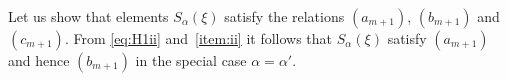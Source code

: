 \documentclass[oneside, 10pt]{amsart}
\newcommand{\rA}{\mathsf{A}}
\numberwithin{equation}{section}
\newtheorem{lemma}{Lemma}
\numberwithin{lemma}{section}
\theoremstyle{definition}
\theoremstyle{remark}
\begin{document}

Let us show that elements $S_\alpha(\xi)$ satisfy the relations $(a_{m+1})$, $(b_{m+1})$ and $(c_{m+1})$.
From \eqref{eq:H1ii} and~\eqref{item:ii} it follows that $S_\alpha(\xi)$  satisfy $(a_{m+1})$ and hence $(b_{m+1})$ in the special case $\alpha=\alpha'$.
\begin{comment}
\begin{lemma} For every $\rA_3$-triple $(\alpha, \beta, \gamma)$ in $\Phi$ and $a,b,c \in A$ the following relation holds in $G_1$:
\begin{align} 
 [x_{\alpha}(a), [x_{\beta}(b t), x_{\gamma}(c t)]] & = [x_{\beta+\alpha}(N_{\beta, \alpha}a b t), x_{\gamma}(ct)].
\end{align}
 \end{lemma}
\begin{proof}
 \begin{align*}
   [x_{\alpha}(a), [x_{\beta}(b t), x_{\gamma}(c t)]] = [[x_{\alpha}(a), x_{\beta}(b t)], {}^{x_{\beta}(b t)}\!x_{\gamma}(ct)] &  \text{ by~\eqref{eq:H1iii} and~$(b_1)$} \\ 
                                                       = {}^{x_{\beta}(b t)}[x_{\alpha +\beta}(N_{\alpha,\beta}abt), x_{\gamma}(ct) ] & \text{ by $(b_1)$ and $(c_1)$}\\ 
                                                       = [x_{\alpha +\beta}(N_{\alpha,\beta}abt), x_{\gamma}(ct)] & \text{ by $(d_1)$. \qedhere}
 \end{align*}  
\end{proof}
\end{comment}
\end{document}
